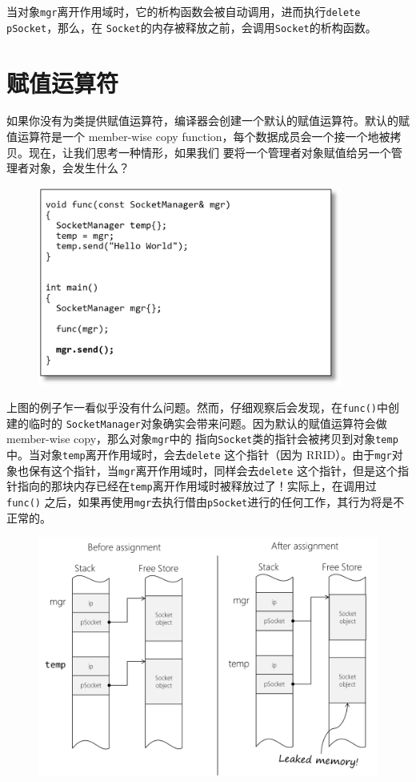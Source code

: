 \documentclass[12pt]{article}
\begin{document}
\indent{}当对象\texttt{mgr}离开作用域时，它的析构函数会被自动调用，进而执行\texttt{delete pSocket}，那么，在
\texttt{Socket}的内存被释放之前，会调用\texttt{Socket}的析构函数。

\section{赋值运算符}
\indent{}如果你没有为类提供赋值运算符，编译器会创建一个默认的赋值运算符。默认的赋值运算符是一个
member-wise copy function，每个数据成员会一个接一个地被拷贝。现在，让我们思考一种情形，如果我们
要将一个管理者对象赋值给另一个管理者对象，会发生什么？

\begin{figure}[h]
\centering
\includegraphics[width=10cm]{./imgs/image.4Y1GS0.png}
\end{figure}

\indent{}上图的例子乍一看似乎没有什么问题。然而，仔细观察后会发现，在\texttt{func()}中创建的临时的
\texttt{SocketManager}对象确实会带来问题。因为默认的赋值运算符会做 member-wise copy，那么对象\texttt{mgr}中的
指向\texttt{Socket}类的指针会被拷贝到对象\texttt{temp}中。当对象\texttt{temp}离开作用域时，会去\texttt{delete}
这个指针（因为 RRID）。由于\texttt{mgr}对象也保有这个指针，当\texttt{mgr}离开作用域时，同样会去\texttt{delete}
这个指针，但是这个指针指向的那块内存已经在\texttt{temp}离开作用域时被释放过了！实际上，在调用过\texttt{func()}
之后，如果再使用\texttt{mgr}去执行借由\texttt{pSocket}进行的任何工作，其行为将是不正常的。

\begin{figure}[h]
\centering
\includegraphics[width=14cm]{./imgs/image.644MS0.png}
\end{figure}
\end{document}
